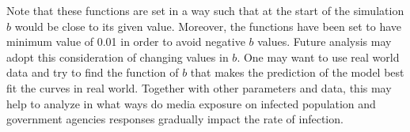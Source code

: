 \documentclass[12pt, reqno]{amsart}
\begin{document}
Note that these functions are set in a way such that at the start of the simulation $b$ would be close to its given value. Moreover, the functions have been set to have minimum value of 0.01 in order to avoid negative $b$ values. Future analysis may adopt this consideration of changing values in $b$. One may want to use real world data and try to find the function of $b$ that makes the prediction of the model best fit the curves in real world. Together with other parameters and data, this may help to analyze in what ways do media exposure on infected population and government agencies responses gradually impact the rate of infection.


    \newpage
    
    
\end{document}
